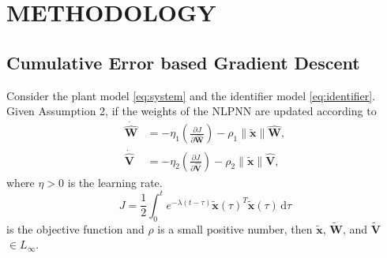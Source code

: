 \documentclass[10pt,twocolumn]{ICCAS}
\newcommand{\ud}{\,\mathrm{d}}
\newcommand{\xtilde}{\tilde{\bm{x}}}
\newcommand{\What}{\hat{\mathbf{W}}}
\newcommand{\Vhat}{\hat{\mathbf{V}}}
\begin{document}
\section{METHODOLOGY}

\subsection{Cumulative Error based Gradient Descent}
\begin{theorem}
Consider the plant model \eqref{eq:system} and the identifier model \eqref{eq:identifier}. Given Assumption 2, if the weights of the NLPNN are updated according to
\begin{align}
    \dot{\mathbf{\What}} &= -\eta_1\left(\frac{\partial J}{\partial \hat{\mathbf{W}}}\right) - \rho_1\|\tilde{\bm{x}}\|\hat{\mathbf{W}},\\
    \dot{\mathbf{\Vhat}} &= -\eta_2\left(\frac{\partial J}{\partial \hat{\mathbf{V}}}\right) - \rho_2\|\tilde{\bm{x}}\|\hat{\mathbf{V}},
\end{align}
where $\eta > 0$ is the learning rate. 
\begin{equation}
J = \frac{1}{2} \int_{0}^{t} e^{-\lambda(t-\tau)} {\xtilde(\tau)}^T \xtilde(\tau) \ud\tau 
\end{equation} 
is the objective function and $\rho$ is a small positive number, then $\tilde{\bm{x}}$, $\tilde{\mathbf{W}}$, and $\tilde{\mathbf{V}}$ $\in L_\infty.$
\end{theorem}
\end{document}
